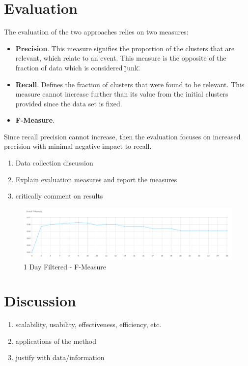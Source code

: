 \documentclass[a4paper,portrait,12pt]{article}
\begin{document}
\section{Evaluation}
\label{section-eval}

The evaluation of the two approaches relies on two measures:
\begin{itemize}
	\item \textbf{Precision}. This measure signifies the proportion of the clusters that are relevant, which relate to an event.
	      This measure is the opposite of the fraction of data which is considered \"junk\".
	\item \textbf{Recall}. Defines the fraction of clusters that were found to be relevant.
	      This measure cannot increase further than its value from the initial clusters provided since the data set is fixed.
	\item \textbf{F-Measure}.
\end{itemize}

Since recall precision cannot increase, then the evaluation focuses on increased precision with minimal negative impact to recall.

\begin{enumerate}
	\item Data collection discussion
	\item Explain evaluation measures and report the measures
	\item critically comment on results
\end{enumerate}

\begin{figure}[h!]
	\centering
	\includegraphics[width=\linewidth]{images/1day-filtered-f-measure.png}
	\caption{1 Day Filtered - F-Measure}
	\label{fig:1day-filtered-f-measure}
\end{figure}

\section{Discussion}
\label{section-discussion}
\begin{enumerate}
	\item scalability, usability, effectiveness, efficiency, etc.
	\item applications of the method
	\item justify with data/information
\end{enumerate}
\end{document}
